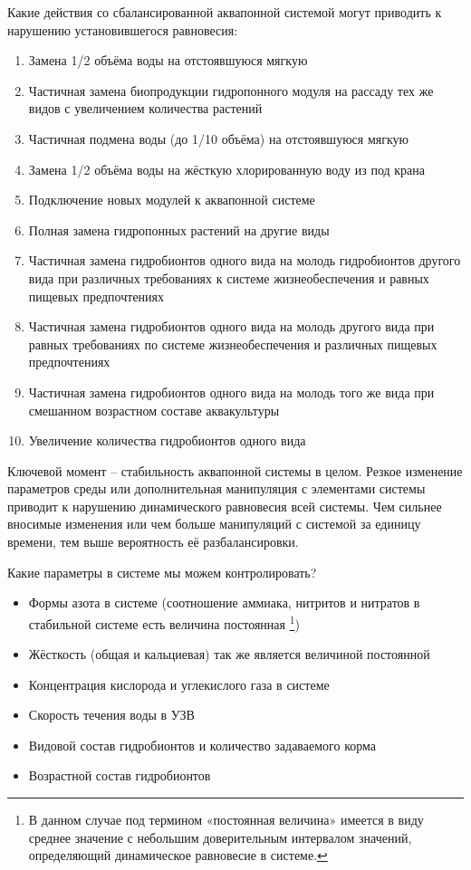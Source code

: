 
Какие действия со сбалансированной аквапонной системой могут приводить к нарушению установившегося равновесия:

\begin{enumerate}
    \item Замена 1/2 объёма воды на отстоявшуюся мягкую
    \item Частичная замена биопродукции гидропонного модуля на рассаду тех же видов с увеличением количества растений
    \item Частичная подмена воды (до 1/10 объёма) на отстоявшуюся мягкую
    \item Замена 1/2 объёма воды на жёсткую хлорированную воду из под крана
    \item Подключение новых модулей к аквапонной системе
    \item Полная замена гидропонных растений на другие виды
    \item Частичная замена гидробионтов одного вида на молодь гидробионтов другого вида при различных требованиях к системе жизнеобеспечения и равных пищевых предпочтениях
    \item Частичная замена гидробионтов одного вида на молодь другого вида при равных требованиях по системе жизнеобеспечения и различных пищевых предпочтениях
    \item Частичная замена гидробионтов одного вида на молодь того же вида при смешанном возрастном составе аквакультуры
    \item Увеличение количества гидробионтов одного вида
\end{enumerate}

\explanationSection

Ключевой момент – стабильность аквапонной системы в целом. Резкое изменение параметров среды или дополнительная манипуляция с элементами системы приводит к нарушению динамического равновесия всей системы. Чем сильнее вносимые изменения или чем больше манипуляций с системой за единицу времени, тем выше вероятность её разбалансировки.

Какие параметры в системе мы можем контролировать? 
\begin{itemize}
    \item Формы азота в системе (соотношение аммиака, нитритов и нитратов в стабильной системе есть величина постоянная \footnote{В данном случае под термином «постоянная величина» имеется в виду среднее значение с небольшим доверительным интервалом значений, определяющий динамическое равновесие в системе.})
    \item Жёсткость (общая и кальциевая) так же является величиной постоянной
    \item Концентрация кислорода и углекислого газа в системе
    \item Скорость течения воды в УЗВ
    \item Видовой состав гидробионтов и количество задаваемого корма
    \item Возрастной состав гидробионтов
\end{itemize}

